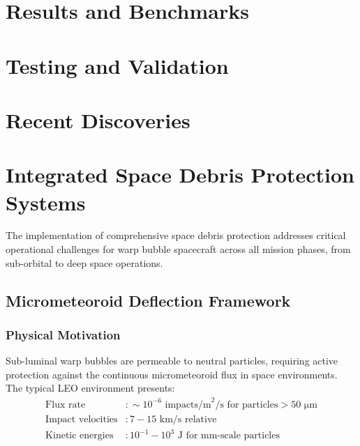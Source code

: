 \documentclass{article}
\begin{document}



\section{Results and Benchmarks}




\section{Testing and Validation}




\section{Recent Discoveries}



\section{Integrated Space Debris Protection Systems}

The implementation of comprehensive space debris protection addresses critical operational challenges for warp bubble spacecraft across all mission phases, from sub-orbital to deep space operations.

\subsection{Micrometeoroid Deflection Framework}

\subsubsection{Physical Motivation}
Sub-luminal warp bubbles are permeable to neutral particles, requiring active protection against the continuous micrometeoroid flux in space environments. The typical LEO environment presents:
\begin{align}
\text{Flux rate} &: \sim 10^{-6} \text{ impacts/m}^2\text{/s for particles} > 50\text{ μm} \\
\text{Impact velocities} &: 7-15 \text{ km/s relative} \\
\text{Kinetic energies} &: 10^{-1} - 10^{3} \text{ J for mm-scale particles}
\end{align}
\end{document}
